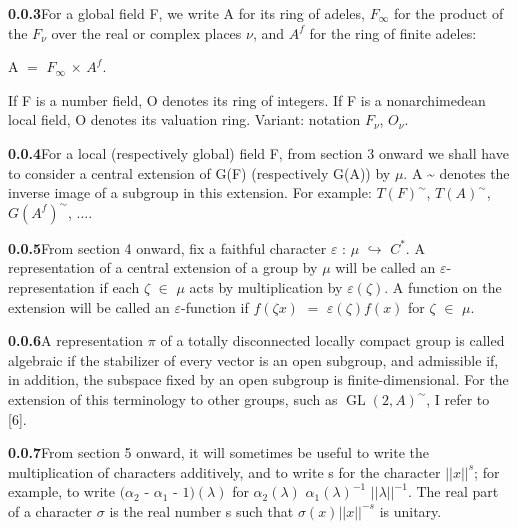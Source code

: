 \documentclass[10pt,a4paper]{article}
\begin{document}
\par\noindent\textbf{0.0.3}\quad For a global field F, we write A for its ring of adeles, $F_\infty{}$ for the product of the $F_\nu{}$ over the real or complex places $\nu{}$, and $A^f$ for the ring of finite adeles:\par
\par\smallskip\begin{center}\begin{minipage}{0.96\textwidth}\centering
A $=$ $F_\infty{}$ $\times{}$ $A^f$.
\end{minipage}\end{center}\smallskip
\par If F is a number field, O denotes its ring of integers. If F is a nonarchimedean local field, O denotes its valuation ring. Variant: notation $F_\nu{}$, $O_\nu{}$.\par
\par\noindent\textbf{0.0.4}\quad For a local (respectively global) field F, from section 3 onward we shall have to consider a central extension of G(F) (respectively G(A)) by $\mu{}$. A \textasciitilde{} denotes the inverse image of a subgroup in this extension. For example: $T(F)^\sim$, $T(A)^\sim$, $G(A^f)^\sim$, ....\par
\par\noindent\textbf{0.0.5}\quad From section 4 onward, fix a faithful character $\varepsilon{}$ : $\mu{}$ $\hookrightarrow{}$ $C^*$. A representation of a central extension of a group by $\mu{}$ will be called an $\varepsilon{}$-representation if each $\zeta{}$ $\in{}$ $\mu{}$ acts by multiplication by $\varepsilon{}(\zeta{})$. A function on the extension will be called an $\varepsilon{}$-function if $f(\zeta{}x)$ $=$ $\varepsilon{}(\zeta{})f(x)$ for $\zeta{}$ $\in{}$ $\mu{}$.\par
\par\noindent\textbf{0.0.6}\quad A representation $\pi{}$ of a totally disconnected locally compact group is called algebraic if the stabilizer of every vector is an open subgroup, and admissible if, in addition, the subspace fixed by an open subgroup is finite-dimensional. For the extension of this terminology to other groups, such as $\operatorname{GL}(2,A)^\sim$, I refer to [6].\par
\par\noindent\textbf{0.0.7}\quad From section 5 onward, it will sometimes be useful to write the multiplication of characters additively, and to write s for the character $||x||^s$; for example, to write $(\alpha{}_2$ - $\alpha{}_1$ - $1)(\lambda{})$ for $\alpha{}_2(\lambda{})$ $\alpha{}_1(\lambda{})^{-1}$ $||\lambda{}||^{-1}$. The real part of a character $\sigma{}$ is the real number s such that $\sigma{}(x)||x||^{-s}$ is unitary.\par
\end{document}
